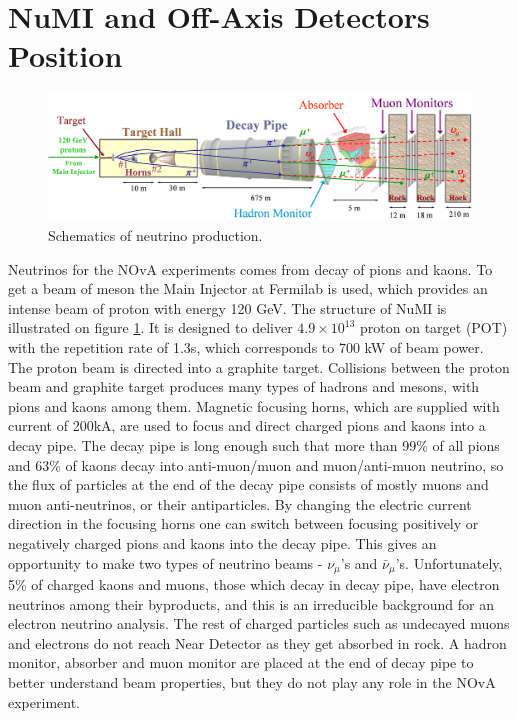 \section{NuMI and Off-Axis Detectors Position}
\begin{figure}
\includegraphics[width=1.0\textwidth]{figures/Beamline.png}
\centering
\caption{Schematics of neutrino production\cite{numi}.} \label{fig:NuMI}
\end{figure}
Neutrinos for the NOvA experiments comes from decay of pions and kaons. To get a beam of 
meson the Main Injector at Fermilab is used, which provides an intense beam of proton with 
energy 120 GeV. The structure of NuMI is illustrated on figure \ref{fig:NuMI}. It is designed to 
deliver $4.9 \times 10^{13}$ proton on target (POT) with the repetition rate of 1.3s, which 
corresponds to 700 kW of beam power. The proton beam is directed into a graphite target.  
Collisions between the proton beam and graphite target produces many types of hadrons and 
mesons, with pions and kaons among them. Magnetic focusing horns, which are supplied with 
current of 200kA, are used to focus and direct 
charged pions and kaons into a decay pipe. The decay pipe is long enough such that more than 
99\% of all pions 
and 63\% of kaons decay into anti-muon/muon and muon/anti-muon neutrino, so the flux of 
particles at the end of the decay pipe consists of mostly muons and muon anti-neutrinos, or 
their antiparticles. By changing the electric current direction in the focusing horns one can 
switch between focusing positively or negatively charged pions and kaons into the decay pipe. 
This gives an opportunity to make two types of neutrino beams - $\nu_\mu$'s and $\bar{\nu}_\mu$'s. 
Unfortunately, 5\% of charged kaons and muons, those which decay in decay pipe, have electron neutrinos 
among their byproducts, and this is an irreducible background for an electron neutrino analysis. 
The rest of charged particles such as undecayed muons and electrons do not reach Near Detector as they 
get absorbed in rock. A hadron monitor, absorber and muon monitor are placed at the end of decay pipe 
to better understand beam properties, but they do not play any role in the NOvA experiment.

